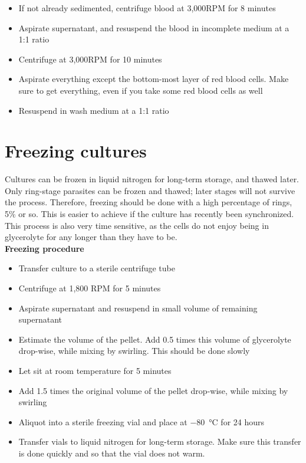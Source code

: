 \documentclass{article}
\begin{document}
\begin{itemize}
	\item If not already sedimented, centrifuge blood at 3,000RPM for 8 minutes
	\item Aspirate supernatant, and resuspend the blood in incomplete medium at a 1:1 ratio
	\item Centrifuge at 3,000RPM for 10 minutes
	\item Aspirate everything except the bottom-most layer of red blood cells. Make sure to get everything, even if you take some red blood cells as well
	\item Resuspend in wash medium at a 1:1 ratio
\end{itemize}

\newpage

\section{Freezing cultures}

Cultures can be frozen in liquid nitrogen for long-term storage, and thawed later.\\

Only ring-stage parasites can be frozen and thawed; later stages will not survive the process. Therefore, freezing should be done with a high percentage of rings, 5\% or so. This is easier to achieve if the culture has recently been synchronized.\\

This process is also very time sensitive, as the cells do not enjoy being in glycerolyte for any longer than they have to be.\\

\textbf{Freezing procedure}

\begin{itemize}
	\item Transfer culture to a sterile centrifuge tube
	\item Centrifuge at 1,800 RPM for 5 minutes
	\item Aspirate supernatant and resuspend in small volume of remaining supernatant
	\item Estimate the volume of the pellet. Add 0.5 times this volume of glycerolyte drop-wise, while mixing by swirling. This should be done slowly
	\item Let sit at room temperature for 5 minutes
	\item Add 1.5 times the original volume of the pellet drop-wise, while mixing by swirling
	\item Aliquot into a sterile freezing vial and place at \SI{-80}{\celsius} for 24 hours
	\item Transfer vials to liquid nitrogen for long-term storage. Make sure this transfer is done quickly and so that the vial does not warm.
\end{itemize}
\end{document}
